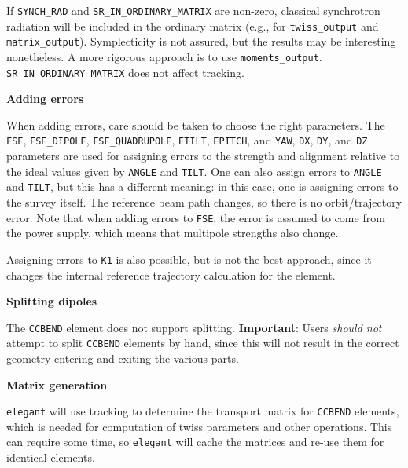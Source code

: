 If \verb|SYNCH_RAD| and \verb|SR_IN_ORDINARY_MATRIX| are non-zero, classical synchrotron radiation will be included in
the ordinary matrix (e.g., for \verb|twiss_output| and \verb|matrix_output|).  Symplecticity is not assured, but the results may
be interesting nonetheless. A more rigorous approach is to use \verb|moments_output|.
\verb|SR_IN_ORDINARY_MATRIX| does not affect tracking.

{\bf Adding errors}

When adding errors, care should be taken to choose the right
parameters.  The \verb|FSE|, \verb|FSE_DIPOLE|, \verb|FSE_QUADRUPOLE|, \verb|ETILT|, \verb|EPITCH|, and
\verb|YAW|, \verb|DX|, \verb|DY|, and \verb|DZ| parameters are used for
assigning errors to the strength and alignment relative to the ideal
values given by \verb|ANGLE| and \verb|TILT|.  One can also assign 
errors to \verb|ANGLE| and \verb|TILT|, but this has a different meaning:
in this case, one is assigning errors to the survey itself.  The reference
beam path changes, so there is no orbit/trajectory error.  Note that when
adding errors to \verb|FSE|, the error is assumed to come from the power
supply, which means that multipole strengths also change.

Assigning errors to \verb|K1| is also possible, but is not the best approach, since
it changes the internal reference trajectory calculation for the element.

{\bf Splitting dipoles}

The \verb|CCBEND| element does not support splitting.
{\bf Important}: Users {\em should not} attempt to split \verb|CCBEND| elements by hand, since this
will not result in the correct geometry entering and exiting the various parts.

{\bf Matrix generation}

{\tt elegant} will use tracking to determine the transport matrix for \verb|CCBEND| elements, which
is needed for computation of twiss parameters and other operations.
This can require some time, so {\tt elegant} will cache the matrices and re-use them for
identical elements.
